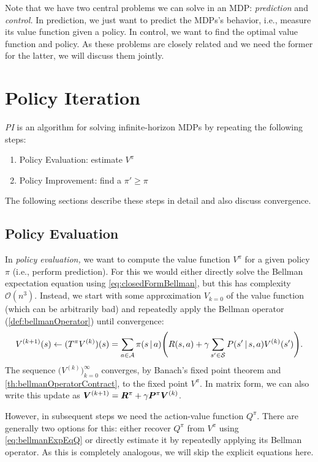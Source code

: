 	Note that we have two central problems we can solve in an \ac{MDP}: \emph{prediction} and \emph{control.} In prediction, we just want to predict the \acp{MDP}'s behavior, i.e., measure its value function given a policy. In control, we want to find the optimal value function and policy. As these problems are closely related and we need the former for the latter, we will discuss them jointly.

	\section{Policy Iteration}
		\emph{\ac{PI}} is an algorithm for solving infinite-horizon \acp{MDP} by repeating the following steps:
		\begin{enumerate}
			\item Policy Evaluation: estimate \(V^\pi\)
			\item Policy Improvement: find a \(\pi' \geq \pi\)
		\end{enumerate}
		The following sections describe these steps in detail and also discuss convergence.

		\subsection{Policy Evaluation}
			In \emph{policy evaluation,} we want to compute the value function \(V^\pi\) for a given policy \(\pi\) (i.e., perform prediction). For this we would either directly solve the Bellman expectation equation using \eqref{eq:closedFormBellman}, but this has complexity \(\mathcal{O}(n^3)\). Instead, we start with some approximation \( V_{k = 0} \) of the value function (which can be arbitrarily bad) and repeatedly apply the Bellman operator (\autoref{def:bellmanOperator}) until convergence:
			\begin{equation}
				V^{(k + 1)}(s)
					\gets (T^\pi V^{(k)})(s)
					= \sum_{a \in \mathcal{A}} \pi(s \,\vert\, a) \Biggl( R(s, a) + \gamma \sum_{s' \in \mathcal{S}} P(s' \,\vert\, s, a) V^{(k)}(s') \Biggr).
			\end{equation}
			The sequence \(\bigl(V^{(k)}\bigr)_{k = 0}^{\infty}\) converges, by Banach's fixed point theorem and \autoref{th:bellmanOperatorContract}, to the fixed point \(V^\pi\). In matrix form, we can also write this update as \( \bm{V}^{(k + 1)} = \bm{R}^\pi + \gamma \bm{P}^\pi \bm{V}^{(k)} \).

			However, in subsequent steps we need the action-value function \(Q^\pi\). There are generally two options for this: either recover \(Q^\pi\) from \(V^\pi\) using \eqref{eq:bellmanExpEqQ} or directly estimate it by repeatedly applying its Bellman operator. As this is completely analogous, we will skip the explicit equations here.

